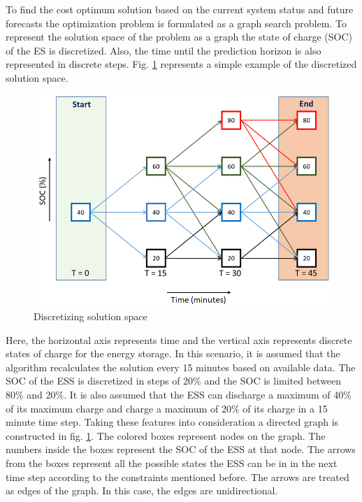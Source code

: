 To find the cost optimum solution based on the current system status and future forecasts the optimization problem is formulated as a graph search problem. To represent the solution space of the problem as a graph the state of charge (SOC) of the ES is discretized. Also, the time until the prediction horizon is also represented in discrete steps. Fig. \ref{fig:F1_Dis} represents a simple example of the discretized solution space.

\begin{figure}[!ht]
    \centering
    \includegraphics[width = \linewidth]{figs/F1_1_Dis.png}
    \caption{Discretizing solution space}
    \label{fig:F1_Dis}
\end{figure}
Here, the horizontal axis represents time and the vertical axis represents discrete states of charge for the energy storage. In this scenario, it is assumed that the algorithm recalculates the solution every 15 minutes based on available data. The SOC of the ESS is discretized in steps of 20\% and the SOC is limited between 80\% and 20\%. It is also assumed that the ESS can discharge a maximum of 40\% of its maximum charge and charge a maximum of 20\% of its charge in a 15 minute time step. Taking these features into consideration a directed graph is constructed in fig. \ref{fig:F1_Dis}. The colored boxes represent nodes on the graph. The numbers inside the boxes represent the SOC of the ESS at that node. The arrows from the boxes represent all the possible states the ESS can be in in the next time step according to the constraints mentioned before. The arrows are treated as edges of the graph. In this case, the edges are unidirectional.

